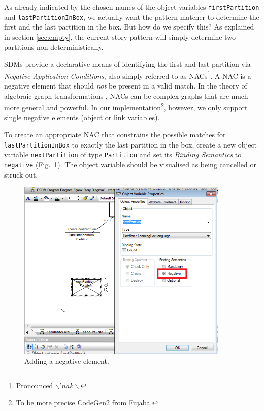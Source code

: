 As already indicated by the chosen names of the object variables
\texttt{first\-Partition} and \texttt{last\-Partition\-In\-Box}, we actually
want the pattern matcher to determine the first and the last partition in the box.
But how do we specify this?  As explained in section \ref{sec:empty}, the
current story pattern will simply determine two partitions
non-deterministically.  

SDMs provide a declarative means of identifying the first and last
partition via \emph{Negative Application Conditions}, also simply
referred to as \mbox{NACs}\footnote{Pronounced $\backslash 'nak \backslash$}.
A \mbox{NAC} is a negative element that should \emph{not} be present in a valid
match.  In the theory of algebraic graph transformations \cite{EEPT06},
\mbox{NACs} can be complex graphs that are much more general and powerful.  In
our implementation\footnote{To be more precise CodeGen2 from Fujaba.}, however,
we only support single negative elements (object or link variables).

To create an appropriate \mbox{NAC} that constrains the possible matches for
\texttt{lastPartitionInBox} to exactly the last partition in the box, create a
new object variable \texttt{nextPartition} of type \texttt{Partition} and set
its \emph{Binding Semantics} to \texttt{negative} (Fig.~\ref{fig:sdm_grow_2}).  
The object variable should be visualised as being cancelled or struck out.
 
\begin{figure}[htbp]
\begin{center}
  \includegraphics[width=0.9\textwidth]{pics/sdmBilder/grow/sdm58RAW}
  \caption{Adding a negative element.}  
  \label{fig:sdm_grow_2}
\end{center}
\end{figure}
 
